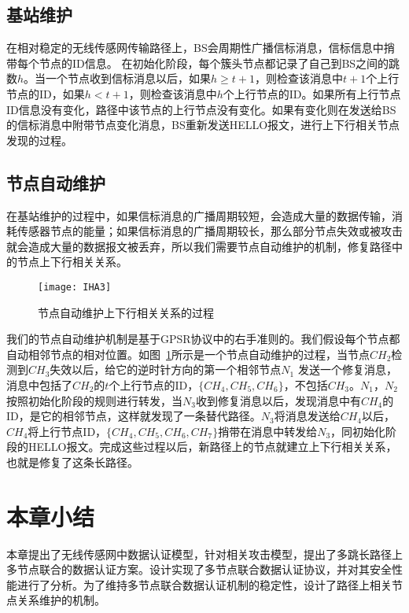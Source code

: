 \subsection{基站维护}
在相对稳定的无线传感网传输路径上，BS会周期性广播信标消息，信标信息中捎带每个节点的ID信息。
在初始化阶段，每个簇头节点都记录了自己到BS之间的跳数$h$。当一个节点收到信标消息以后，如果$h\geq t+1$，则检查该消息中$t+1$个上行节点的ID，如果$h< t+1$，则检查该消息中$h$个上行节点的ID。如果所有上行节点ID信息没有变化，路径中该节点的上行节点没有变化。如果有变化则在发送给BS的信标消息中附带节点变化消息，BS重新发送HELLO报文，进行上下行相关节点发现的过程。
\subsection{节点自动维护}
在基站维护的过程中，如果信标消息的广播周期较短，会造成大量的数据传输，消耗传感器节点的能量；如果信标消息的广播周期较长，那么部分节点失效或被攻击就会造成大量的数据报文被丢弃，所以我们需要节点自动维护的机制，修复路径中的节点上下行相关关系。
\begin{figure}[htbp]
  \centering
  \texttt{[image: IHA3]}
  \caption{节点自动维护上下行相关关系的过程}
  \label{fig:IHA3}
\end{figure}

我们的节点自动维护机制是基于GPSR协议中的右手准则的。我们假设每个节点都自动相邻节点的相对位置。如图~\ref{fig:IHA3}所示是一个节点自动维护的过程，当节点$CH_2$检测到$CH_3$失效以后，给它的逆时针方向的第一个相邻节点$N_1$ 发送一个修复消息，消息中包括了$CH_2$的$t$个上行节点的ID，$\{CH_4,CH_5,CH_6\}$，不包括$CH_3$。$N_1$，$N_2$按照初始化阶段的规则进行转发，当$N_3$收到修复消息以后，发现消息中有$CH_4$的ID，是它的相邻节点，这样就发现了一条替代路径。$N_3$将消息发送给$CH_4$以后，$CH_4$将上行节点ID，$\{CH_4,CH_5,CH_6,CH_7\}$捎带在消息中转发给$N_3$，同初始化阶段的HELLO报文。完成这些过程以后，新路径上的节点就建立上下行相关关系，也就是修复了这条长路径。

\section{本章小结}
本章提出了无线传感网中数据认证模型，针对相关攻击模型，提出了多跳长路径上多节点联合的数据认证方案。设计实现了多节点联合数据认证协议，并对其安全性能进行了分析。为了维持多节点联合数据认证机制的稳定性，设计了路径上相关节点关系维护的机制。


